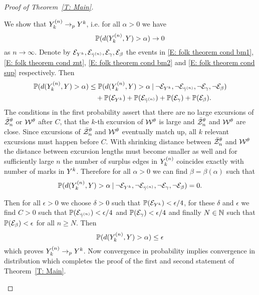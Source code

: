 \begin{proof}[Proof of Theorem~\ref{T: Main}]
\begin{proofpart}
	We show that $Y^{(n)}_k \rightarrow_p Y^k$, i.e. for all $\alpha > 0$ we have
	\begin{equation}
		\mathbb{P}( d(Y^{(n)}_k, Y) > \alpha) \rightarrow 0
	\end{equation}
	as $n \rightarrow \infty$.
	Denote by $\mathcal{E}_{Y^k}, \mathcal{E}_{\bar{\gamma}^{(n)}}, \mathcal{E}_{\gamma}, \mathcal{E}_{\beta}$ the events in 
	\eqref{E: folk theorem cond bm1}, \eqref{E: folk theorem cond znt}, \eqref{E: folk theorem cond bm2} and \eqref{E: folk theorem cond sup} respectively.
	Then
	\begin{equation}
		\begin{aligned}
		\mathbb{P}( d(Y^{(n)}_k, Y) > \alpha) 
		&\leq \mathbb{P}( d(Y^{(n)}_k, Y) > \alpha \: | \: \neg\mathcal{E}_{Y^k}, \neg\mathcal{E}_{\bar{\gamma}^{(n)}}, \neg\mathcal{E}_{\gamma}, \neg\mathcal{E}_{\beta}) \\
		&\quad + \mathbb{P}(\mathcal{E}_{Y^k}) + \mathbb{P}(\mathcal{E}_{\bar{\gamma}^{(n)}}) + \mathbb{P}(\mathcal{E}_{\gamma}) + \mathbb{P}(\mathcal{E}_{\beta}). 
		\end{aligned}
	\end{equation}
	The conditions in the first probability assert that there are no large excursions of $\bar{\mathcal{Z}}^{\theta}_n$ or $\mathcal{W}^{\theta}$ after $C$,
	that the $k$-th excursion of $\mathcal{W}^{\theta}$ is large and $\bar{\mathcal{Z}}^{\theta}_n$ and $\mathcal{W}^{\theta}$ are close.
	Since excursions of $\bar{\mathcal{Z}}^{\theta}_n$ and $\mathcal{W}^{\theta}$ eventually match up, 
	all $k$ relevant excursions must happen before $C$.
	With shrinking distance between $\bar{\mathcal{Z}}^{\theta}_n$ and $\mathcal{W}^{\theta}$ the distance between excursion lengths must become smaller as well
	and for sufficiently large $n$ the number of surplus edges in $Y^{(n)}_k$ coincides exactly with number of marks in $Y^k$.
	Therefore for all $\alpha > 0$ we can find $\beta = \beta(\alpha)$ such that
	\begin{equation}
		\mathbb{P}( d(Y^{(n)}_k, Y) > \alpha \: | \: \neg\mathcal{E}_{Y^k}, \neg\mathcal{E}_{\bar{\gamma}^{(n)}}, \neg\mathcal{E}_{\gamma}, \neg\mathcal{E}_{\beta}) = 0.
	\end{equation}
	
	Then for all $\epsilon > 0$ we choose $\delta > 0$ such that $\mathbb{P}(\mathcal{E}_{Y^k}) < \epsilon / 4$,
	for these $\delta$ and $\epsilon$ we find $C > 0$ such that $\mathbb{P}(\mathcal{E}_{\bar{\gamma}^{(n)}}) < \epsilon / 4$ and $\mathbb{P}(\mathcal{E}_{\gamma}) < \epsilon / 4$
	and finally $N \in \mathbb{N}$ such that $\mathbb{P}(\mathcal{E}_{\beta}) < \epsilon$ for all $n \geq N$.
	Then
	\begin{equation}
		\mathbb{P}( d(Y^{(n)}_k, Y) > \alpha) \leq \epsilon
	\end{equation}
	which proves $Y^{(n)}_k \rightarrow_p Y^k$.
	Now convergence in probability implies convergence in distribution which completes the proof of the first and second statement of Theorem~\ref{T: Main}.
	\end{proofpart}



\end{proof}
